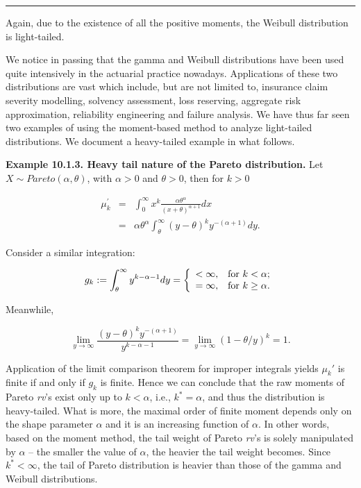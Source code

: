 \documentclass[]{book}
\theoremstyle{definition}
\theoremstyle{definition}
\theoremstyle{definition}
\theoremstyle{remark}
\begin{document}
\begin{center}\rule{0.5\linewidth}{\linethickness}\end{center}

Again, due to the existence of all the positive moments, the Weibull
distribution is light-tailed.

We notice in passing that the gamma and Weibull distributions have been
used quite intensively in the actuarial practice nowadays. Applications
of these two distributions are vast which include, but are not limited
to, insurance claim severity modelling, solvency assessment, loss
reserving, aggregate risk approximation, reliability engineering and
failure analysis. We have thus far seen two examples of using the
moment-based method to analyze light-tailed distributions. We document a
heavy-tailed example in what follows.

\textbf{Example 10.1.3. Heavy tail nature of the Pareto distribution.}
Let \(X\sim Pareto(\alpha,\theta)\), with \(\alpha>0\) and \(\theta>0\),
then for \(k>0\)

\begin{eqnarray*}
    \mu_k^{'} &=& \int_0^{\infty} x^k \frac{\alpha \theta^{\alpha}}{(x+\theta)^{\alpha+1}} dx \\
    &=& \alpha \theta^{\alpha} \int_{\theta}^{\infty} (y-\theta)^k {y^{-(\alpha+1)}} dy.
\end{eqnarray*}

Consider a similar integration:

\begin{eqnarray*}
  g_k:=\int_{\theta}^{\infty} {y^{k-\alpha-1}} dy=\left\{
  \begin{array}{ll}
    <\infty, & \hbox{for } k<\alpha;\\
    =\infty, & \hbox{for } k\geq \alpha.
  \end{array}
\right.
\end{eqnarray*}

Meanwhile,

\[\lim_{y\rightarrow \infty} \frac{(y-\theta)^k {y^{-(\alpha+1)}}}{y^{k-\alpha-1}}=\lim_{y\rightarrow \infty}
(1-\theta/y)^{k}=1.\]

Application of the limit comparison theorem for improper integrals
yields \(\mu_k'\) is finite if and only if \(g_k\) is finite. Hence we
can conclude that the raw moments of Pareto \emph{rv}'s exist only up to
\(k<\alpha\), i.e., \(k^{\ast}=\alpha\), and thus the distribution is
heavy-tailed. What is more, the maximal order of finite moment depends
only on the shape parameter \(\alpha\) and it is an increasing function
of \(\alpha\). In other words, based on the moment method, the tail
weight of Pareto \emph{rv}'s is solely manipulated by \(\alpha\) -- the
smaller the value of \(\alpha\), the heavier the tail weight becomes.
Since \(k^{\ast}<\infty\), the tail of Pareto distribution is heavier
than those of the gamma and Weibull distributions.
\end{document}
